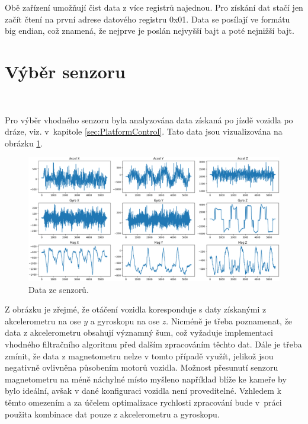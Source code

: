 Obě zařízení umožňují čist data z více registrů najednou. Pro získání dat stačí jen
začít čtení na první adrese datového registru 0x01. Data se posílají ve formátu big
endian, což znamená, že nejprve je poslán nejvyšší bajt a poté nejnižší bajt.

\section{Výběr senzoru}\

Pro výběr vhodného senzoru byla analyzována data získaná po jízdě vozidla po dráze,
viz. v~kapitole \ref{sec:PlatformControl}. Tato data jsou vizualizována na obrázku
\ref{fig:Sensors}.
\begin{figure}[!h]
    \centering
    \includegraphics[width = 1\linewidth]{Figures/Sensors.png}
    \caption{Data ze senzorů.}
    \label{fig:Sensors}
\end{figure}

Z obrázku je zřejmé, že otáčení vozidla koresponduje s daty získanými
z akcelerometru na ose $y$ a gyroskopu na ose $z$. Nicméně je třeba poznamenat, že
data z akcelerometru obsahují významný šum, což vyžaduje implementaci vhodného
filtračního algoritmu před dalším zpracováním těchto dat. Dále je třeba zmínit, že
data z magnetometru nelze v tomto případě využít, jelikož jsou negativně ovlivněna
působením motorů vozidla. Možnost přesunutí senzoru magnetometru na méně náchylné
místo myšleno například blíže ke kameře by bylo ideální, avšak v dané konfiguraci
vozidla není proveditelné. Vzhledem k těmto omezením a za účelem optimalizace
rychlosti zpracování bude v~práci použita kombinace dat pouze z akcelerometru a
gyroskopu.

\endinput
